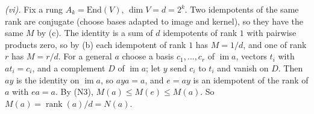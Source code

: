 \emph{(vi).} Fix a rung $A_{k} = \mathrm{End}(V)$, $\dim V = d = 2^{k}$. Two idempotents of the same rank are conjugate (choose bases adapted to image and kernel), so they have the same $M$ by (c). The identity is a sum of $d$ idempotents of rank $1$ with pairwise products zero, so by (b) each idempotent of rank $1$ has $M = 1/d$, and one of rank $r$ has $M = r/d$. For a general $a$ choose a basis $c_{1}, \dots, c_{r}$ of $\operatorname{im}a$, vectors $t_{i}$ with $at_{i} = c_{i}$, and a complement $D$ of $\operatorname{im}a$; let $y$ send $c_{i}$ to $t_{i}$ and vanish on $D$. Then $ay$ is the identity on $\operatorname{im}a$, so $aya = a$, and $e = ay$ is an idempotent of the rank of $a$ with $ea = a$. By (N3), $M(a) \le M(e) \le M(a)$. So $M(a) = \operatorname{rank}(a)/d = N(a)$.
